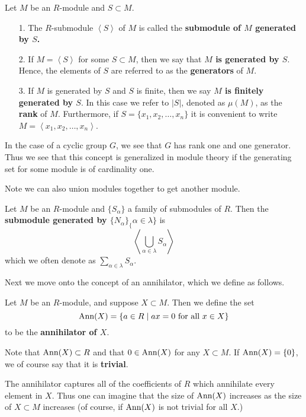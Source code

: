 \begin{definition}
    Let $M$ be an $R$-module and $S \subset M$.
    \begin{itemize}
        \item[1.] The $R$-submodule $\left< S \right>$ of $M$ is
        called the \textbf{submodule of $M$ generated by $S$.}
        \item[2.] If $M = \left< S \right>$ for some $S \subset M$, then we say that
        \textbf{$M$ is generated by $S$}. Hence, the elements of
        $S$ are referred to as the \textbf{generators} of $M$.
        \item[3.] If $M$ is generated by $S$ and $S$ is finite,
        then we say \textbf{$M$ is finitely generated by $S$}. In
        this case we refer to $|S|$, denoted as $\mu(M)$, as the
        \textbf{rank} of $M$. Furthermore, if $S = \{x_1, x_2,
        \dots, x_n\}$ it is convenient to write $M = \left< x_1,
        x_2, \dots, x_n \right>$.
    \end{itemize}
\end{definition}

In the case of a cyclic group $G$, we see that $G$ has rank one
and one generator. Thus we see that this concept is generalized in
module theory if the generating set for some module is of
cardinality one. 

Note we can also union modules together to get another module.
\begin{definition}
    Let $M$ be an $R$-module and $\{S_{\alpha}\}$ a family of
    submodules of $R$. Then the \textbf{submodule generated by
    $\{N_{\alpha}\}_\{\alpha \in \lambda\}$} is 
    \[
        \left< \bigcup_{\alpha \in \lambda}S_\alpha\right>
    \]
    which we often denote as $\displaystyle \sum_{\alpha \in \lambda}S_{\alpha}$.
\end{definition}

Next we move onto the concept of an annihilator, which we define
as follows. 

\begin{definition}
    Let $M$ be an $R$-module, and suppose $X \subset M$. Then we
    define the set 
    \[
        \mbox{Ann}(X) = \{a \in R \mid ax = 0 \text{ for all }x \in X\}
    \]
    to be the \textbf{annihilator of $X$}.
\end{definition}
\textcolor{NavyBlue}{Note that $\mbox{Ann}(X) \subset R$ and that
$0 \in \mbox{Ann}(X)$ for any $X \subset M$. If $\mbox{Ann}(X) = \{0\}$, we of
course say that it is \textbf{trivial}.}

The annihilator captures
all of the coefficients of $R$ which annihilate every element in
$X$. Thus one can imagine that the size of $\mbox{Ann}(X)$ increases as
the size of
$X \subset M$ increases (of course, if $\mbox{Ann}(X)$ is not trivial for all $X$.)


